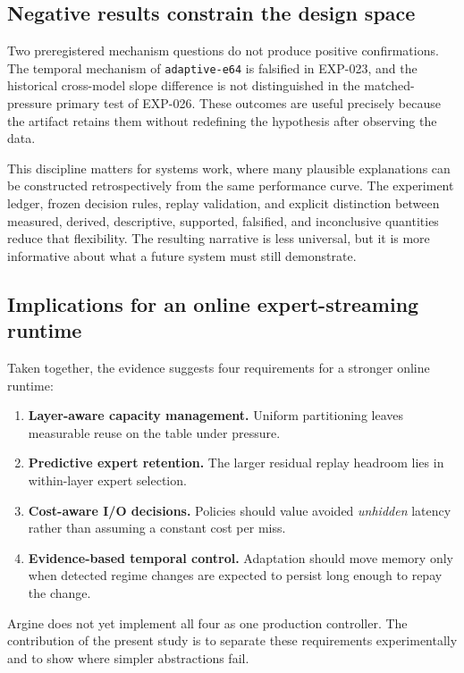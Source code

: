 \subsection{Negative results constrain the design space}

Two preregistered mechanism questions do not produce positive confirmations. The temporal mechanism of \texttt{adaptive-e64} is falsified in EXP-023, and the historical cross-model slope difference is not distinguished in the matched-pressure primary test of EXP-026. These outcomes are useful precisely because the artifact retains them without redefining the hypothesis after observing the data.

This discipline matters for systems work, where many plausible explanations can be constructed retrospectively from the same performance curve. The experiment ledger, frozen decision rules, replay validation, and explicit distinction between measured, derived, descriptive, supported, falsified, and inconclusive quantities reduce that flexibility. The resulting narrative is less universal, but it is more informative about what a future system must still demonstrate.

\subsection{Implications for an online expert-streaming runtime}

Taken together, the evidence suggests four requirements for a stronger online runtime:
\begin{enumerate}
    \item \textbf{Layer-aware capacity management.} Uniform partitioning leaves measurable reuse on the table under pressure.
    \item \textbf{Predictive expert retention.} The larger residual replay headroom lies in within-layer expert selection.
    \item \textbf{Cost-aware I/O decisions.} Policies should value avoided \emph{unhidden} latency rather than assuming a constant cost per miss.
    \item \textbf{Evidence-based temporal control.} Adaptation should move memory only when detected regime changes are expected to persist long enough to repay the change.
\end{enumerate}

Argine does not yet implement all four as one production controller. The contribution of the present study is to separate these requirements experimentally and to show where simpler abstractions fail.
